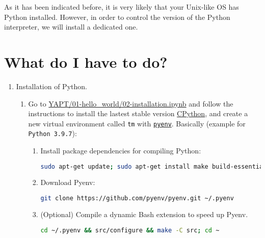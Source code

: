 As it has been indicated before, it is very likely that your Unix-like
OS has Python installed. However, in order to control the version of
the Python interpreter, we will install a dedicated one.

\section{What do I have to do?}

\begin{enumerate}
  
\item Installation of Python.
  
  \begin{enumerate}
    
  \item Go to
    \href{https://github.com/vicente-gonzalez-ruiz/YAPT/blob/master/01-hello_world/02-installation.ipynb}{YAPT/01-hello\_world/02-installation.ipynb}
    \cite{YAPT} and follow the instructions to install the lastest
    stable version
    \href{https://en.wikipedia.org/wiki/CPython}{CPython}, and create
    a new virtual environment called \texttt{tm} with
    \href{https://github.com/pyenv/pyenv}{\texttt{pyenv}}. Basically
    (example for \verb|Python 3.9.7|):

    \begin{enumerate}
    \item Install package dependencies for compiling Python:
      
      \begin{lstlisting}[mathescape=false, language=Bash]
sudo apt-get update; sudo apt-get install make build-essential libssl-dev zlib1g-dev libbz2-dev libreadline-dev libsqlite3-dev wget curl llvm libncursesw5-dev xz-utils tk-dev libxml2-dev libxmlsec1-dev libffi-dev liblzma-dev
\end{lstlisting}

\item Download Pyenv:
  \begin{lstlisting}[mathescape=false, language=Bash]
git clone https://github.com/pyenv/pyenv.git ~/.pyenv
\end{lstlisting}
        
\item (Optional) Compile a dynamic Bash extension to speed up Pyenv.
  \begin{lstlisting}[mathescape=false, language=Bash]
cd ~/.pyenv && src/configure && make -C src; cd ~
\end{lstlisting}


\end{enumerate}
\end{enumerate}
\end{enumerate}
